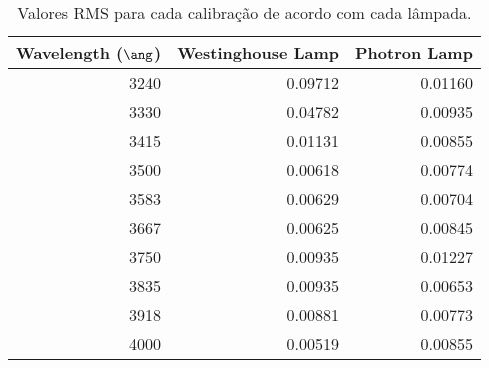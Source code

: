 \begin{table}
\centering
\caption{Valores RMS para cada calibração de acordo com cada lâmpada.}
\begin{tabular}{rrr}
\toprule
Wavelength ($\ang$) & Westinghouse Lamp & Photron Lamp \\
\midrule
               3240 &           0.09712 &      0.01160 \\
               3330 &           0.04782 &      0.00935 \\
               3415 &           0.01131 &      0.00855 \\
               3500 &           0.00618 &      0.00774 \\
               3583 &           0.00629 &      0.00704 \\
               3667 &           0.00625 &      0.00845 \\
               3750 &           0.00935 &      0.01227 \\
               3835 &           0.00935 &      0.00653 \\
               3918 &           0.00881 &      0.00773 \\
               4000 &           0.00519 &      0.00855 \\
\bottomrule
\end{tabular}
\end{table}
